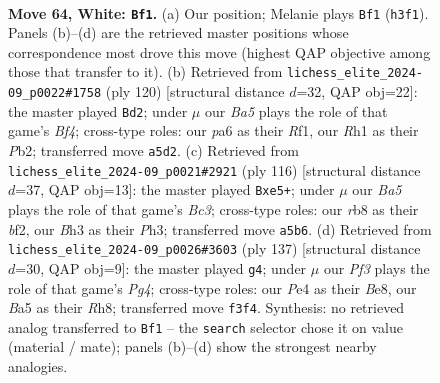 \documentclass[11pt]{article}
\begin{document}
\clearpage

\begin{figure}[p]\centering
\begin{subfigure}{0.46\textwidth}\centering
\resizebox{\linewidth}{!}{%
\newchessgame
\chessboard[
  setfen={1r6/4b3/pn1p2kp/B3p3/4P2p/5P1B/5K2/7R w - - 4 64},
  showmover=false,
  pgfstyle=straightmove, color=movearrow, markmove={h3-f1}
]}
\caption{}
\end{subfigure}\hfill
\begin{subfigure}{0.46\textwidth}\centering
\resizebox{\linewidth}{!}{%
\newchessgame
\chessboard[
  setfen={8/1p4r1/p1p1kp2/P3n3/5B1P/7K/1PP5/5R2 w - - 10 61},
  showmover=false,
  pgfstyle=straightmove, color=movearrow, markmove={f4-d2}
]}
\caption{}
\end{subfigure}
\\[4pt]
\begin{subfigure}{0.46\textwidth}\centering
\resizebox{\linewidth}{!}{%
\newchessgame
\chessboard[
  setfen={6R1/8/3k2p1/1pp1n1p1/5p2/P1B2P1P/2K2b2/8 w - - 10 59},
  showmover=false,
  pgfstyle=straightmove, color=movearrow, markmove={c3-e5}
]}
\caption{}
\end{subfigure}\hfill
\begin{subfigure}{0.46\textwidth}\centering
\resizebox{\linewidth}{!}{%
\newchessgame
\chessboard[
  setfen={4b2r/2R4P/1P5k/4P1p1/4B3/p4PK1/P7/8 b - - 0 69},
  showmover=false,
  pgfstyle=straightmove, color=movearrow, markmove={g5-g4}
]}
\caption{}
\end{subfigure}
\caption{\textbf{Move 64, White: \texttt{Bf1}.} (a) Our position; Melanie plays \texttt{Bf1} (\texttt{h3f1}). Panels (b)--(d) are the retrieved master positions whose correspondence most drove this move (highest QAP objective among those that transfer to it). (b) Retrieved from \texttt{lichess\_elite\_2024-09\_p0022\#1758} (ply 120) [structural distance $d$=32, QAP obj=22]: the master played \texttt{Bd2}; under $\mu$ our \emph{Ba5} plays the role of that game's \emph{Bf4}; cross-type roles: our \emph{p}a6 as their \emph{R}f1, our \emph{R}h1 as their \emph{P}b2; transferred move \texttt{a5d2}. (c) Retrieved from \texttt{lichess\_elite\_2024-09\_p0021\#2921} (ply 116) [structural distance $d$=37, QAP obj=13]: the master played \texttt{Bxe5+}; under $\mu$ our \emph{Ba5} plays the role of that game's \emph{Bc3}; cross-type roles: our \emph{r}b8 as their \emph{b}f2, our \emph{B}h3 as their \emph{P}h3; transferred move \texttt{a5b6}. (d) Retrieved from \texttt{lichess\_elite\_2024-09\_p0026\#3603} (ply 137) [structural distance $d$=30, QAP obj=9]: the master played \texttt{g4}; under $\mu$ our \emph{Pf3} plays the role of that game's \emph{Pg4}; cross-type roles: our \emph{P}e4 as their \emph{B}e8, our \emph{B}a5 as their \emph{R}h8; transferred move \texttt{f3f4}. Synthesis: no retrieved analog transferred to \texttt{Bf1} -- the \texttt{search} selector chose it on value (material / mate); panels (b)--(d) show the strongest nearby analogies.}
\label{fig:thought-m126}
\end{figure}
\end{document}

